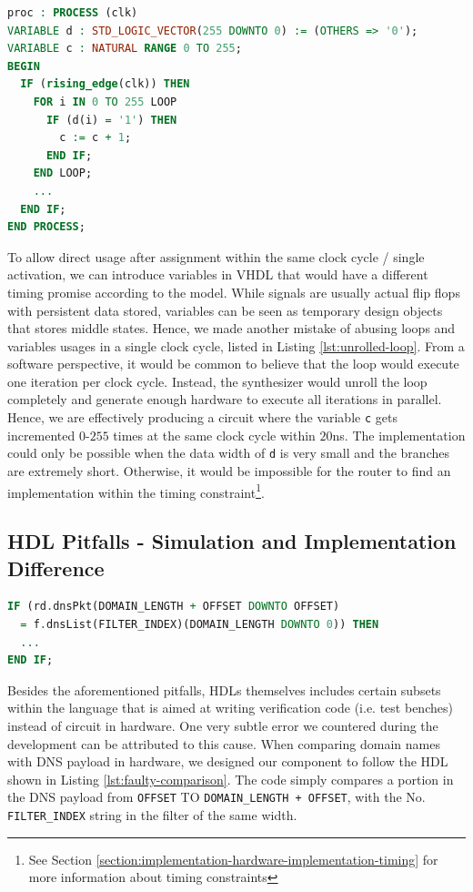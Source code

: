 \documentclass[a4paper]{report}
\newcommand{\proglang}{\textsf}
\newcommand{\code}{\texttt}
\begin{document}
\begin{lstlisting}[language=VHDL, caption=Faulty Unrolled Loop Sample in \proglang{VHDL}, label={lst:unrolled-loop}]
proc : PROCESS (clk)
VARIABLE d : STD_LOGIC_VECTOR(255 DOWNTO 0) := (OTHERS => '0');
VARIABLE c : NATURAL RANGE 0 TO 255;
BEGIN
  IF (rising_edge(clk)) THEN
    FOR i IN 0 TO 255 LOOP
      IF (d(i) = '1') THEN
        c := c + 1;
      END IF;
    END LOOP;
    ... 
  END IF;
END PROCESS;
\end{lstlisting}

To allow direct usage after assignment within the same clock cycle / single activation, we can introduce variables in \proglang{VHDL} that would have a different timing promise according to the model. While signals are usually actual flip flops with persistent data stored, variables can be seen as temporary design objects that stores middle states. Hence, we made another mistake of abusing loops and variables usages in a single clock cycle, listed in Listing \ref{lst:unrolled-loop}. From a software perspective, it would be common to believe that the loop would execute one iteration per clock cycle. Instead, the synthesizer would unroll the loop completely and generate enough hardware to execute all iterations in parallel. Hence, we are effectively producing a circuit where the variable \code{c} gets incremented $0$-$255$ times at the same clock cycle within $20$ns. The implementation could only be possible when the data width of \code{d} is very small and the branches are extremely short. Otherwise, it would be impossible for the router to find an implementation within the timing constraint\footnote{See Section \ref{section:implementation-hardware-implementation-timing} for more information about timing constraints}.

\subsection{HDL Pitfalls - Simulation and Implementation Difference}
\label{section:implementation-hardware-debugging-hdl-pitfalls-simulation-and-implementation}

\begin{lstlisting}[language=VHDL, caption=Faulty \code{STD\_LOGIC\_VECTOR} comparison in \proglang{VHDL}, label={lst:faulty-comparison}]
IF (rd.dnsPkt(DOMAIN_LENGTH + OFFSET DOWNTO OFFSET)
  = f.dnsList(FILTER_INDEX)(DOMAIN_LENGTH DOWNTO 0)) THEN
  ...
END IF;
\end{lstlisting}

Besides the aforementioned pitfalls, HDLs themselves includes certain subsets within the language that is aimed at writing verification code (i.e. test benches) instead of circuit in hardware. One very subtle error we countered during the development can be attributed to this cause. When comparing domain names with DNS payload in hardware, we designed our component to follow the HDL shown in Listing \ref{lst:faulty-comparison}. The code simply compares a portion in the DNS payload from \code{OFFSET} TO \code{DOMAIN\_LENGTH + OFFSET}, with the No. \code{FILTER\_INDEX} string in the filter of the same width.
\end{document}
